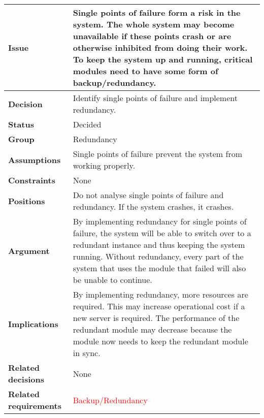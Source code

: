 
\label{dd:redundancy}
\begin{tabular}{ l  p{10cm}}
\hline
\bf Issue & Single points of failure form a risk in the system. The whole system may become unavailable if these points crash or are otherwise inhibited from doing their work. To keep the system up and running, critical modules need to have some form of backup/redundancy. \\
\hline
\bf Decision & Identify single points of failure and implement redundancy. \\
\hline
\bf Status & Decided \\
\hline
\bf Group & Redundancy \\
\hline
\bf Assumptions & Single points of failure prevent the system from working properly. \\
\hline
\bf Constraints & None \\
\hline
\bf Positions & Do not analyse single points of failure and redundancy. If the system crashes, it crashes. \\
\hline
\bf Argument & By implementing redundancy for single points of failure, the system will be able to switch over to a redundant instance and thus keeping the system running. Without redundancy, every part of the system that uses the module that failed will also be unable to continue. \\
\hline
\bf Implications & By implementing redundancy, more resources are required. This may increase operational cost if a new server is required. The performance of the redundant module may decrease because the module now needs to keep the redundant module in sync. \\
\hline
\bf Related decisions & None \\
\hline
\bf Related requirements & \textcolor{red}{Backup/Redundancy} \\
\hline
\end{tabular}

